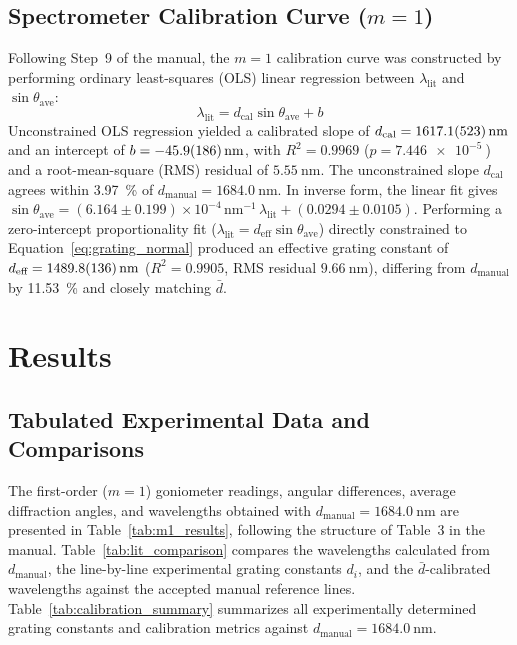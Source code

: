 \documentclass[journal]{IEEEtran}
\begin{document}
\subsection{Spectrometer Calibration Curve (\texorpdfstring{$m = 1$}{m = 1})}
Following Step~9 of the manual, the $m = 1$ calibration curve was constructed by performing ordinary least-squares (OLS) linear regression between $\lambda_{\text{lit}}$ and $\sin\theta_{\text{ave}}$:
\begin{equation}
    \lambda_{\text{lit}} = d_{\text{cal}} \sin\theta_{\text{ave}} + b
    \label{eq:calibration_ols}
\end{equation}
Unconstrained OLS regression yielded a calibrated slope of $d_{\text{cal}} = \SI{1617.1 \pm 52.3}{\nano\meter}$ and an intercept of $b = \SI{-45.9 \pm 18.6}{\nano\meter}$, with $R^2 = 0.9969$ ($p = \SI{7.446e-5}{}$) and a root-mean-square (RMS) residual of $\SI{5.55}{\nano\meter}$. The unconstrained slope $d_{\text{cal}}$ agrees within \SI{3.97}{\percent} of $d_{\text{manual}} = \SI{1684.0}{\nano\meter}$. In inverse form, the linear fit gives $\sin\theta_{\text{ave}} = (6.164 \pm 0.199) \times 10^{-4}\,\mathrm{nm^{-1}}\,\lambda_{\text{lit}} + (0.0294 \pm 0.0105)$. Performing a zero-intercept proportionality fit ($\lambda_{\text{lit}} = d_{\text{eff}} \sin\theta_{\text{ave}}$) directly constrained to Equation~\eqref{eq:grating_normal} produced an effective grating constant of $d_{\text{eff}} = \SI{1489.8 \pm 13.6}{\nano\meter}$ ($R^2 = 0.9905$, RMS residual $\SI{9.66}{\nano\meter}$), differing from $d_{\text{manual}}$ by \SI{11.53}{\percent} and closely matching $\bar{d}$.

\section{Results}

\subsection{Tabulated Experimental Data and Comparisons}
The first-order ($m = 1$) goniometer readings, angular differences, average diffraction angles, and wavelengths obtained with $d_{\text{manual}} = \SI{1684.0}{\nano\meter}$ are presented in Table~\ref{tab:m1_results}, following the structure of Table~3 in the manual. Table~\ref{tab:lit_comparison} compares the wavelengths calculated from $d_{\text{manual}}$, the line-by-line experimental grating constants $d_i$, and the $\bar{d}$-calibrated wavelengths against the accepted manual reference lines. Table~\ref{tab:calibration_summary} summarizes all experimentally determined grating constants and calibration metrics against $d_{\text{manual}} = \SI{1684.0}{\nano\meter}$.
\end{document}
